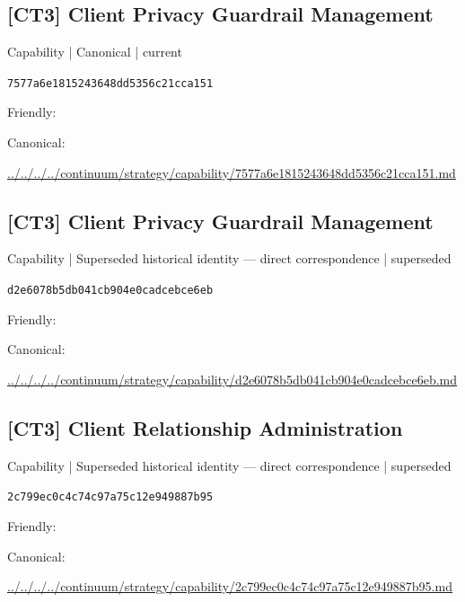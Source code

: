 \documentclass[10pt,a4paper]{article}
\begin{document}
\subsection*{[CT3] Client Privacy Guardrail Management}
{\small Capability | Canonical | current}\par
\texttt{7577a6e1815243648dd5356c21cca151}\par
Friendly: \par
Canonical: \par
{\footnotesize\url{../../../../continuum/strategy/capability/7577a6e1815243648dd5356c21cca151.md}}\par
\subsection*{[CT3] Client Privacy Guardrail Management}
{\small Capability | Superseded historical identity — direct correspondence | superseded}\par
\texttt{d2e6078b5db041cb904e0cadcebce6eb}\par
Friendly: \par
Canonical: \par
{\footnotesize\url{../../../../continuum/strategy/capability/d2e6078b5db041cb904e0cadcebce6eb.md}}\par
\subsection*{[CT3] Client Relationship Administration}
{\small Capability | Superseded historical identity — direct correspondence | superseded}\par
\texttt{2c799ec0c4c74c97a75c12e949887b95}\par
Friendly: \par
Canonical: \par
{\footnotesize\url{../../../../continuum/strategy/capability/2c799ec0c4c74c97a75c12e949887b95.md}}\par
\end{document}
